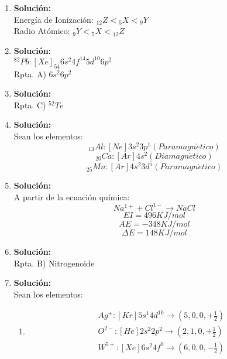 \documentclass{article}
\begin{document}
\begin{enumerate}
    \item 
    \textbf{Solución:}\\
    Energ\'ia de Ionizaci\'on:
    ${}_{12}Z<{}_5X<{}_9Y$\\
    Radio At\'omico:
    ${}_9Y<{}_5X<{}_{12}Z$


    \item 
    \textbf{Solución:}\\
    $^{82}Pb: [Xe]_{54}6s^{2}4f^{14}5d^{10}6p^{2}$\\
    Rpta. A) $6s^{2}6p^{2}$


    \item 
    \textbf{Solución:}\\
    Rpta. C) $^{52}Te$

    \item 
    \textbf{Solución:}\\
    Sean los elementos:
    $${}_{13}Al: [Ne]3s^{2}3p^{1} (Paramagn\acute{e}tico)$$
    $${}_{20}Ca: [Ar]4s^{2} (Diamagn\acute{e}tico)$$
    $${}_{25}Mn: [Ar]4s^{2}3d^{5} (Paramagn\acute{e}tico)$$


    \item 
    \textbf{Solución:}\\
    A partir de la ecuaci\'on qu\'imica:
    $$Na^{1+} + Cl^{1-} \longrightarrow NaCl$$
    $$EI = 496 KJ/mol$$
    $$AE = -348 KJ/mol$$
    $$\Delta E = 148 KJ/mol$$


    \item 
    \textbf{Solución:}\\
    Rpta. B) Nitrogenoide


    \item 
    \textbf{Solución:}\\
    Sean los elementos:
    \begin{enumerate}
        \item 
        \begin{equation*}
            \begin{split}
                Ag^{+}: [Kr]5s^{1}4d^{10} \to \left(5,0,0,+\frac{1}{2}\right)\\
                O^{2-}: [He]2s^{2}2p^{2} \to \left(2,1,0,+\frac{1}{2}\right)\\
                W^{5+}: [Xe]6s^{2}4f^{9} \to \left(6,0,0,-\frac{1}{2}\right)            
            \end{split}
        \end{equation*}
        

\end{enumerate}
\end{enumerate}
\end{document}
